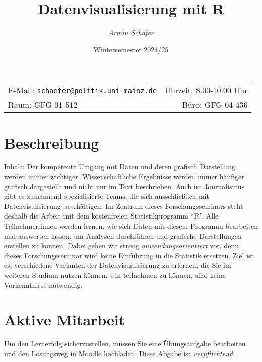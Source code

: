 \documentclass[11pt,]{scrartcl}
\title{\textbf{Datenvisualisierung mit R}}
\author{\emph{Armin Schäfer}}
\date{Wintersemester 2024/25}
\begin{document}
  
	
		\maketitle
		
	
	\thispagestyle{firststyle}
	
	
	\noindent \begin{tabular*}{\textwidth}{ @{\extracolsep{\fill}} lr @{\extracolsep{\fill}}}
		
		
	E-Mail: \texttt{\href{mailto:schaefer@politik.uni-mainz.de}{\nolinkurl{schaefer@politik.uni-mainz.de}}} & Uhrzeit: 8.00-10.00
Uhr\\
	Raum: GFG 01-512 & Büro: GFG 04-436\\
		\hline
	\end{tabular*}
	
	\vspace{2mm}
	
	
	
	\section{Beschreibung}\label{beschreibung}

Inhalt: Der kompetente Umgang mit Daten und deren grafisch Darstellung
werden immer wichtiger. Wissenschaftliche Ergebnisse werden immer
häufiger grafisch dargestellt und nicht nur im Text beschrieben. Auch im
Journalismus gibt es zunehmend spezialisierte Teams, die sich
ausschließlich mit Datenvisulisierung beschäftigen. Im Zentrum dieses
Forschungsseminars steht deshalb die Arbeit mit dem kostenfreien
Statistikprogramm ``R''. Alle Teilnehmer:innen werden lernen, wie sich
Daten mit diesem Programm bearbeiten und auswerten lassen, um Analysen
durchführen und grafische Darstellungen erstellen zu können. Dabei gehen
wir streng \emph{anwendungsorientiert} vor, denn dieses
Forschungsseminar wird keine Einführung in die Statistik ersetzen. Ziel
ist es, verschiedene Varianten der Datenvisualisierung zu erlernen, die
Sie im weiteren Studium nutzen können. Um teilnehmen zu können, sind
keine Vorkenntnisse notwendig.

\section{Aktive Mitarbeit}\label{aktive-mitarbeit}

Um den Lernerfolg sicherzustellen, müssen Sie eine Übungsaufgabe
bearbeiten und den Lösungsweg in Moodle hochladen. Diese Abgabe ist
\emph{verpflichtend}.
\end{document}
